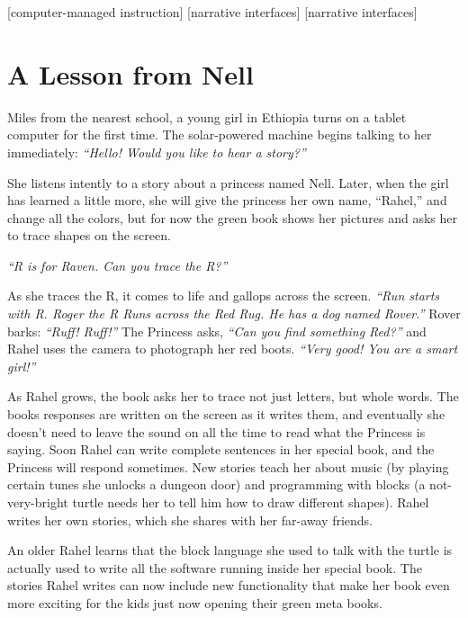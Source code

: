 \documentclass{acm_proc_article-sp}
\begin{document}
[computer-managed instruction]
[narrative interfaces]
[narrative interfaces]


\section{A Lesson from Nell}

Miles from the nearest school, a young girl in Ethiopia turns on a
tablet computer for the first time.  The solar-powered machine begins
talking to her immediately: \textit{``Hello!  Would you like to hear a story?''}

She listens intently to a story about a princess named Nell.  Later, when
the girl has learned a little more, she will give the princess her own
name, ``Rahel,'' and change all the colors, but for now the green
book shows her pictures and asks her to trace shapes on the screen.

\textit{``R is for Raven.  Can you trace the R?''}

As she traces the R, it comes to life and gallops across the screen.
\textit{``Run starts with R.  Roger the R Runs across the Red Rug.  He has a
dog named Rover.''}  Rover barks: \textit{``Ruff! Ruff!''}  The Princess asks,
\textit{``Can you find something Red?''} and Rahel uses the camera to
photograph her red boots. \textit{``Very good!  You are a smart girl!''}

As Rahel grows, the book asks her to trace not just letters, but whole
words.   The books responses are written on the screen as it writes
them, and eventually she doesn't need to leave the sound on all the
time to read what the Princess is saying.  Soon Rahel can write
complete sentences in her special book, and the Princess will respond
sometimes.  New stories teach her about music (by playing certain
tunes she unlocks a dungeon door) and programming with blocks (a
not-very-bright turtle needs her to tell him how to draw different
shapes).  Rahel writes her own stories, which she shares with her
far-away friends.

An older Rahel learns that the block language she used to talk with
the turtle is actually used to write all the software running inside
her special book.  The stories Rahel writes can now include new
functionality that make her book even more exciting for the kids
just now opening their green meta books.
\end{document}
